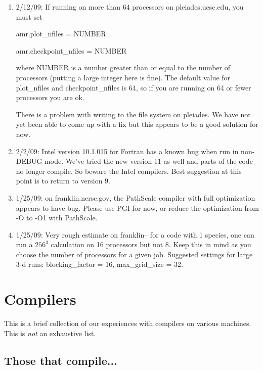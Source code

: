 \begin{enumerate}
\item 2/12/09: If running on more than 64 processors on pleiades.ucsc.edu, you must set

amr.plot\_nfiles = NUMBER

amr.checkpoint\_nfiles = NUMBER

where NUMBER is a number greater than or equal to the number of processors (putting a large integer here is fine). The default value for plot\_nfiles and checkpoint\_nfiles is 64, so if you are running on 64 or fewer processors you are ok.

There is a problem with writing to the file system on pleiades. We have not yet been able to come up with a fix but this appears to be a good solution for now.

\item 2/2/09: Intel version 10.1.015 for Fortran has a known bug when run in non-DEBUG mode. We've tried the new version 11 as well and parts of the code no longer compile. So beware the Intel compilers. Best suggestion at this point is to return to version 9.

\item 1/25/09: on franklin.nersc.gov, the PathScale compiler with full optimization appears to have bug. Please use PGI for now, or reduce the optimization from -O to -O1 with PathScale.

\item 1/25/09: Very rough estimate on franklin-- for a code with 1 species, one can run a $256^3$ calculation on 16 processors but not 8. Keep this in mind as you choose the number of processors for a given job. Suggested settings for large 3-d runs: blocking\_factor = 16, max\_grid\_size = 32. 
\end{enumerate}

\newpage
\section{Compilers}

This is a brief collection of our experiences with compilers on various machines.  This is {\em not} an exhaustive list.

\subsection{Those that compile...}


